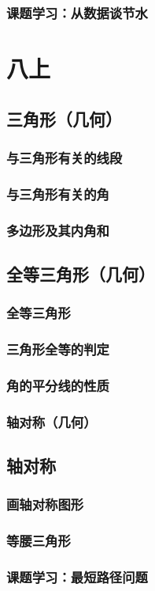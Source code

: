 \documentclass[cn,blue,10pt]{elegantbook}
\begin{document}
\section{课题学习：从数据谈节水}
\part{八上}
\chapter{三角形（几何）}
\section{与三角形有关的线段}
\section{与三角形有关的角}
\section{多边形及其内角和}
\chapter{全等三角形（几何）}
\section{全等三角形}
\section{三角形全等的判定}
\section{角的平分线的性质}
\section{轴对称（几何）}
\chapter{轴对称}
\section{画轴对称图形}
\section{等腰三角形}
\section{课题学习：最短路径问题}
\end{document}
